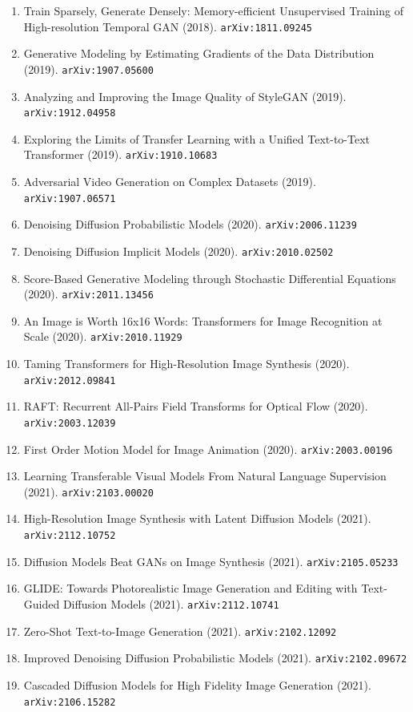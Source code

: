 \documentclass[11pt]{article}
\begin{document}
\begin{enumerate}
  \item Train Sparsely, Generate Densely: Memory-efficient Unsupervised Training
  of High-resolution Temporal GAN (2018). \texttt{arXiv:1811.09245}
  \item Generative Modeling by Estimating Gradients of the Data Distribution (2019). \texttt{arXiv:1907.05600}
  \item Analyzing and Improving the Image Quality of StyleGAN (2019). \texttt{arXiv:1912.04958}
  \item Exploring the Limits of Transfer Learning with a Unified Text-to-Text
  Transformer (2019). \texttt{arXiv:1910.10683}
  \item Adversarial Video Generation on Complex Datasets (2019). \texttt{arXiv:1907.06571}
  \item Denoising Diffusion Probabilistic Models (2020). \texttt{arXiv:2006.11239}
  \item Denoising Diffusion Implicit Models (2020). \texttt{arXiv:2010.02502}
  \item Score-Based Generative Modeling through Stochastic Differential
  Equations (2020). \texttt{arXiv:2011.13456}
  \item An Image is Worth 16x16 Words: Transformers for Image Recognition at
  Scale (2020). \texttt{arXiv:2010.11929}
  \item Taming Transformers for High-Resolution Image Synthesis (2020). \texttt{arXiv:2012.09841}
  \item RAFT: Recurrent All-Pairs Field Transforms for Optical Flow (2020). \texttt{arXiv:2003.12039}
  \item First Order Motion Model for Image Animation (2020). \texttt{arXiv:2003.00196}
  \item Learning Transferable Visual Models From Natural Language Supervision (2021). \texttt{arXiv:2103.00020}
  \item High-Resolution Image Synthesis with Latent Diffusion Models (2021). \texttt{arXiv:2112.10752}
  \item Diffusion Models Beat GANs on Image Synthesis (2021). \texttt{arXiv:2105.05233}
  \item GLIDE: Towards Photorealistic Image Generation and Editing with
  Text-Guided Diffusion Models (2021). \texttt{arXiv:2112.10741}
  \item Zero-Shot Text-to-Image Generation (2021). \texttt{arXiv:2102.12092}
  \item Improved Denoising Diffusion Probabilistic Models (2021). \texttt{arXiv:2102.09672}
  \item Cascaded Diffusion Models for High Fidelity Image Generation (2021). \texttt{arXiv:2106.15282}

\end{enumerate}
\end{document}
